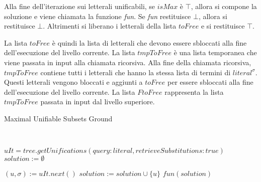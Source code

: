 \documentclass[./main.tex]{subfiles}
\begin{document}
Alla fine dell'iterazione sui letterali unificabili, se $isMax$ è $\top$, 
allora si compone la soluzione e viene chiamata la funzione \textit{fun}.
Se \textit{fun} restituisce $\bot$, allora si restituisce $\bot$.
Altrimenti si liberano i letterali della lista $toFree$ e si restituisce $\top$.

La lista $toFree$ è quindi la lista di letterali che devono essere sbloccati alla fine dell'esecuzione del livello corrente.
La lista $tmpToFree$ è una lista temporanea che viene passata in input alla chiamata ricorsiva. 
Alla fine della chiamata ricorsiva, $tmpToFree$ contiene tutti i letterali che hanno la stessa lista di termini di $literal^\sigma$.
Questi letterali vengono bloccati e aggiunti a $toFree$ per essere sbloccati alla fine dell'esecuzione del livello corrente.
La lista $FtoFree$ rappresenta la lista $tmpToFree$ passata in input dal livello superiore.


\begin{algorithm}[H] \label{alg:groundMus}
    \caption{Maximal Unifiable Subsets Ground}
    \\

$uIt = tree.getUnifications(query: literal, retrieveSubstitutions: true)$\;
$solution := \emptyset$\;

 {
    $(u, \sigma) := uIt.next()$\;
     {
        $solution := solution \cup \{u\}$\;
    }
}
\Return $fun(solution)$\;
\end{algorithm}
\end{document}
